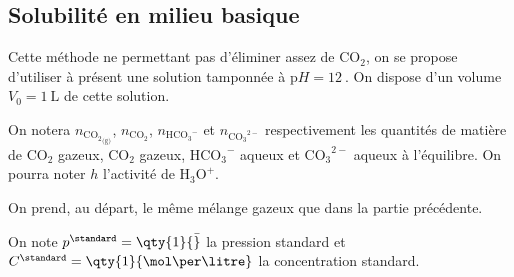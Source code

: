 \documentclass[a4paper,french,bookmarks]{article}
\begin{document}
    \subsection{Solubilité en milieu basique}
    
    Cette méthode ne permettant pas d'éliminer assez de $\mathrm C\mathrm O_2$, on se propose d'utiliser à présent une solution tamponnée à $\mathrm pH = \qty{12}{}$. On dispose d'un volume $V_0 = \qty{1}{\liter }$ de cette solution.
    
    \begin{enumerate}
        \itt On notera $n_{{\mathrm C\mathrm O_2}_\text{(g)}}$, $n_{{\mathrm C\mathrm O_2}}$, $n_{{\mathrm H\mathrm C\mathrm O_3}^-}$ et $n_{{\mathrm C\mathrm O_3}^{2-}}$ respectivement les quantités de matière de $\mathrm C\mathrm O_2$ gazeux, $\mathrm C\mathrm O_2$ gazeux, ${\mathrm H\mathrm C\mathrm O_3}^-$ aqueux et ${\mathrm C\mathrm O_3}^{2-}$ aqueux à l'équilibre. On pourra noter $h$ l'activité de $\mathrm H_3\mathrm O^+$.
        
        \itt On prend, au départ, le même mélange gazeux que dans la partie précédente.
        
        \itt On note $p^\standard = \qty{1}{\bar}$ la pression standard et $C^\standard = \qty{1}{\mol\per\litre}$ la concentration standard.
    \end{enumerate}
    
\end{document}
